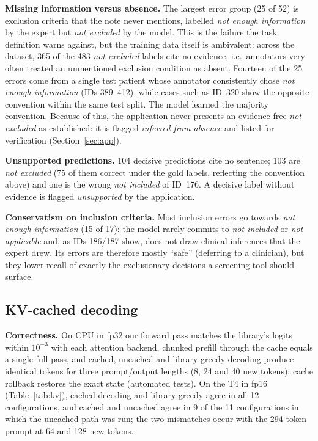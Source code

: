 \textbf{Missing information versus absence.} The largest error group (25 of 52) is exclusion
criteria that the note never mentions, labelled \emph{not enough information} by the expert but
\emph{not excluded} by the model. This is the failure the task definition warns against, but the
training data itself is ambivalent: across the dataset, 365 of the 483 \emph{not excluded} labels
cite no evidence, i.e.\ annotators very often treated an unmentioned exclusion condition as absent.
Fourteen of the 25 errors come from a single test patient whose annotator consistently chose
\emph{not enough information} (IDs 389--412), while cases such as ID~320 show the opposite
convention within the same test split. The model learned the majority convention. Because of this,
the application never presents an evidence-free \emph{not excluded} as established: it is flagged
\emph{inferred from absence} and listed for verification (Section~\ref{sec:app}).

\textbf{Unsupported predictions.} 104 decisive predictions cite no sentence; 103 are \emph{not
excluded} (75 of them correct under the gold labels, reflecting the convention above) and one is the
wrong \emph{not included} of ID~176. A decisive label without evidence is flagged \emph{unsupported}
by the application.

\textbf{Conservatism on inclusion criteria.} Most inclusion errors go towards \emph{not enough
information} (15 of 17): the model rarely commits to \emph{not included} or \emph{not applicable}
and, as IDs 186/187 show, does not draw clinical inferences that the expert drew. Its errors are
therefore mostly ``safe'' (deferring to a clinician), but they lower recall of exactly the
exclusionary decisions a screening tool should surface.

\subsection{KV-cached decoding}
\label{sec:res-kv}

\textbf{Correctness.} On CPU in fp32 our forward pass matches the library's logits within $10^{-3}$
with each attention backend, chunked prefill through the cache equals a single full pass, and
cached, uncached and library greedy decoding produce identical tokens for three prompt/output
lengths (8, 24 and 40 new tokens); cache rollback restores the exact state (automated tests). On the
T4 in fp16 (Table~\ref{tab:kv}), cached decoding and library greedy agree in all 12 configurations,
and cached and uncached agree in 9 of the 11 configurations in which the uncached path was run; the two mismatches occur with the 294-token prompt at 64
and 128 new tokens.

